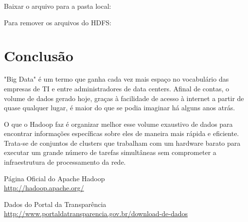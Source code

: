 \documentclass[a4paper,11pt]{article}
\begin{document}
Baixar o arquivo para a pasta local: \\

Para remover os arquivos do HDFS: \\

\section{Conclusão}
"Big Data" é um termo que ganha cada vez mais espaço no vocabulário das empresas de TI e entre administradores de data centers. Afinal de contas, o volume de dados gerado hoje, graças à facilidade de acesso à internet a partir de quase qualquer lugar, é maior do que se podia imaginar há alguns anos atrás.

O que o Hadoop faz é organizar melhor esse volume exaustivo de dados para encontrar informações específicas sobre eles de maneira mais rápida e eficiente. Trata-se de conjuntos de clusters que trabalham com um hardware barato para executar um grande número de tarefas simultâneas sem comprometer a infraestrutura de processamento da rede. 



\begin{thebibliography}{5}
	Página Oficial do Apache Hadoop \\
	\url{http://hadoop.apache.org/}
	
	Dados do Portal da Transparência \\
	\url{http://www.portaldatransparencia.gov.br/download-de-dados}
	
    
\end{thebibliography}
\end{document}
